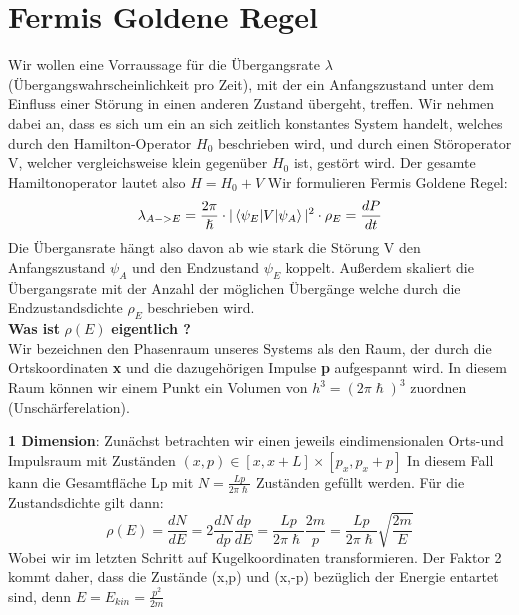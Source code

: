 \documentclass[Ex4_Zusammenfassung.tex]{subfiles}
\begin{document}
\section{Fermis Goldene Regel}
Wir wollen eine Vorraussage für die Übergangsrate $ \lambda $ (Übergangswahrscheinlichkeit pro Zeit), mit der ein Anfangszustand unter dem Einfluss einer Störung in einen anderen Zustand übergeht, treffen. Wir nehmen dabei an, dass es sich um ein an sich zeitlich konstantes System handelt, welches durch den Hamilton-Operator $ H_0 $ beschrieben wird, und durch einen Störoperator V, welcher vergleichsweise klein gegenüber  $ H_0 $ ist, gestört wird. Der gesamte Hamiltonoperator lautet also $ H = H_0 + V $ \newline
Wir formulieren Fermis Goldene Regel: 
\begin{equation}
\lambda_{A->E} = \frac{2\pi}{\hslash} \cdot |\braket{\psi_{E} | V |\psi_{A}}|^2 \cdot \rho_{E} = \frac{dP}{dt}
\end{equation}
Die Übergansrate hängt also davon ab wie stark die Störung V den Anfangszustand $ \psi_A $ und den Endzustand $ \psi_E $ koppelt. Außerdem skaliert die Übergangsrate mit der Anzahl der möglichen Übergänge welche durch die Endzustandsdichte $ \rho_{E} $ beschrieben wird. \\

\textbf{Was ist} $\rho(E)$ \textbf{eigentlich ?}
\\ \newline
Wir bezeichnen den Phasenraum unseres Systems als den Raum, der durch die Ortskoordinaten \textbf{x} und die dazugehörigen Impulse \textbf{p} aufgespannt wird. In diesem Raum können wir einem Punkt ein Volumen von $ h^3 = (2\pi \hslash)^3 $ zuordnen (Unschärferelation). \newline 

\textbf{1 Dimension}: \newline
Zunächst betrachten wir einen jeweils eindimensionalen Orts-und Impulsraum mit Zuständen $ (x,p) \in  [x,x+L] \times [p_{x},p_{x}+p] $ In diesem Fall kann die Gesamtfläche Lp mit $ N = \frac{Lp}{2\pi \hslash} $ Zuständen gefüllt werden. Für die Zustandsdichte gilt dann: 
\begin{equation}
 \rho(E) = \frac{dN}{dE} = 2 \frac{dN}{dp} \frac{dp}{dE} = \frac{Lp}{2\pi \hslash} \frac{2m}{p} =  \frac{Lp}{2\pi \hslash} \sqrt{\frac{2m}{E}} 
 \end{equation}
 Wobei wir im letzten Schritt auf Kugelkoordinaten transformieren. 
 Der Faktor 2 kommt daher, dass die Zustände (x,p) und (x,-p) bezüglich der Energie entartet sind, denn $ E = E_{kin} = \frac{p^2}{2m} $ \newline
 
\end{document}
